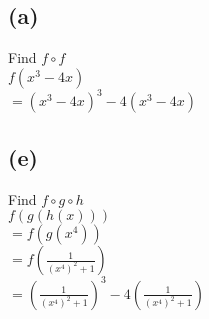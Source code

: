 \documentclass[11pt]{article}
\begin{document}
\subsection*{(a)}
\begin{center}
Find $f \circ f$\\
\hfill \break
$f(x^{3} - 4x)$\\
$= (x^{3} - 4x)^{3} - 4(x^{3} - 4x)$
\end{center}

\subsection*{(e)}
\begin{center}
Find $f \circ g \circ h$\\
\hfill \break
$f(g(h(x)))$\\
$= f(g(x^{4}))$\\
$= f(\frac{1}{(x^{4})^{2} + 1})$\\
$= (\frac{1}{(x^{4})^{2} + 1})^{3} - 4(\frac{1}{(x^{4})^{2} + 1})$
\end{center}
\end{document}
